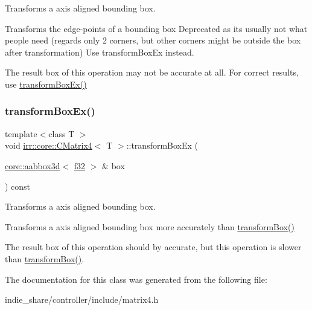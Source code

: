 Transforms a axis aligned bounding box. 

Transforms the edge-\/points of a bounding box Deprecated as it\textquotesingle{}s usually not what people need (regards only 2 corners, but other corners might be outside the box after transformation) Use transform\+Box\+Ex instead.

The result box of this operation may not be accurate at all. For correct results, use \hyperlink{classirr_1_1core_1_1CMatrix4_a2fcdfa14ef16240470e2b46d19a5cb43}{transform\+Box\+Ex()} \mbox{\label{classirr_1_1core_1_1CMatrix4_a2fcdfa14ef16240470e2b46d19a5cb43}} 
\subsubsection{\texorpdfstring{transform\+Box\+Ex()}{transformBoxEx()}}
{\footnotesize\ttfamily template$<$class T $>$ \\
void \hyperlink{classirr_1_1core_1_1CMatrix4}{irr\+::core\+::\+C\+Matrix4}$<$ T $>$\+::transform\+Box\+Ex (\begin{DoxyParamCaption}\item[{\hyperlink{classirr_1_1core_1_1aabbox3d}{core\+::aabbox3d}$<$ \hyperlink{namespaceirr_a0277be98d67dc26ff93b1a6a1d086b07}{f32} $>$ \&}]{box }\end{DoxyParamCaption}) const\hspace{0.3cm}{\ttfamily [inline]}}



Transforms a axis aligned bounding box. 

Transforms a axis aligned bounding box more accurately than \hyperlink{classirr_1_1core_1_1CMatrix4_a0e6a0a3b1b20aac7313806fdb1a01316}{transform\+Box()}

The result box of this operation should by accurate, but this operation is slower than \hyperlink{classirr_1_1core_1_1CMatrix4_a0e6a0a3b1b20aac7313806fdb1a01316}{transform\+Box()}. 

The documentation for this class was generated from the following file\+:\begin{DoxyCompactItemize}
\item 
indie\+\_\+share/controller/include/matrix4.\+h\end{DoxyCompactItemize}
